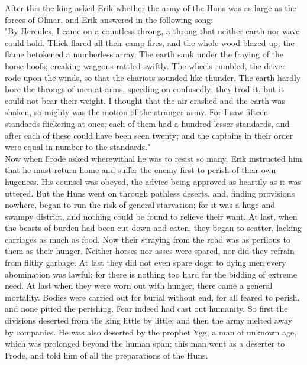 \documentclass[10pt,a4paper]{report}
\begin{document}
After this the king asked Erik whether the army of the Huns was as large as the forces of Olmar, and Erik answered in the following song:\\

"By Hercules, I came on a countless throng, a throng that neither earth nor wave could hold. Thick flared all their camp-fires, and the whole wood blazed up; the flame betokened a numberless array. The earth sank under the fraying of the horse-hoofs; creaking waggons rattled swiftly. The wheels rumbled, the driver rode upon the winds, so that the chariots sounded like thunder. The earth hardly bore the throngs of men-at-arms, speeding on confusedly; they trod it, but it could not bear their weight. I thought that the air crashed and the earth was shaken, so mighty was the motion of the stranger army. For I saw fifteen standards flickering at once; each of them had a hundred lesser standards, and after each of these could have been seen twenty; and the captains in their order were equal in number to the standards."\\

Now when Frode asked wherewithal he was to resist so many, Erik instructed him that he must return home and suffer the enemy first to perish of their own hugeness. His counsel was obeyed, the advice being approved as heartily as it was uttered. But the Huns went on through pathless deserts, and, finding provisions nowhere, began to run the risk of general starvation; for it was a huge and swampy district, and nothing could be found to relieve their want. At last, when the beasts of burden had been cut down and eaten, they began to scatter, lacking carriages as much as food. Now their straying from the road was as perilous to them as their hunger. Neither horses nor asses were spared, nor did they refrain from filthy garbage. At last they did not even spare dogs: to dying men every abomination was lawful; for there is nothing too hard for the bidding of extreme need. At last when they were worn out with hunger, there came a general mortality. Bodies were carried out for burial without end, for all feared to perish, and none pitied the perishing. Fear indeed had cast out humanity. So first the divisions deserted from the king little by little; and then the army melted away by companies. He was also deserted by the prophet Ygg, a man of unknown age, which was prolonged beyond the human span; this man went as a deserter to Frode, and told him of all the preparations of the Huns.\\
\end{document}
